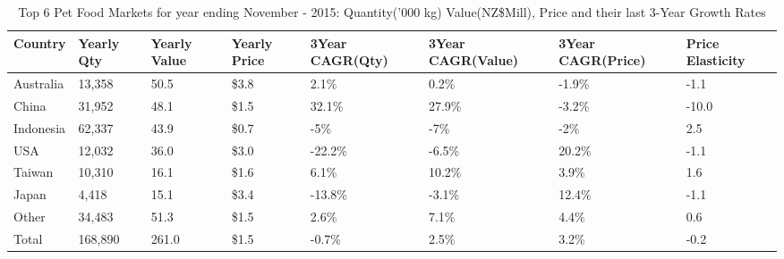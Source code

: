 \begin{table}[ht]
\centering
{\scriptsize
\begin{tabular}[t]{p{1.8cm}>{\hfill}p{1.4cm}>{\hfill}p{1.4cm}>{\hfill}p{1.6cm}>{\hfill}p{1.9cm}>{\hfill}p{2cm}>{\hfill}p{1.9cm}>{\hfill}p{1.5cm}}
 \textbf{Country} & \textbf{Yearly Qty} & \textbf{Yearly Value} & \textbf{Yearly Price} & \textbf{3Year CAGR(Qty)} & \textbf{3Year CAGR(Value)} & \textbf{3Year CAGR(Price)} & \textbf{Price Elasticity} \\
\hline
Australia & 13,358 & 50.5 & \$3.8 & 2.1\% & 0.2\% & -1.9\% & -1.1 \\  
China & 31,952 & 48.1 & \$1.5 & 32.1\% & 27.9\% & -3.2\% & -10.0 \\  
Indonesia & 62,337 & 43.9 & \$0.7 & -5\% & -7\% & -2\% & 2.5 \\  
USA & 12,032 & 36.0 & \$3.0 & -22.2\% & -6.5\% & 20.2\% & -1.1 \\  
Taiwan & 10,310 & 16.1 & \$1.6 & 6.1\% & 10.2\% & 3.9\% & 1.6 \\  
Japan & 4,418 & 15.1 & \$3.4 & -13.8\% & -3.1\% & 12.4\% & -1.1 \\  
Other & 34,483 & 51.3 & \$1.5 & 2.6\% & 7.1\% & 4.4\% & 0.6 \\  
Total & 168,890 & 261.0 & \$1.5 & -0.7\% & 2.5\% & 3.2\% & -0.2 \\  
\hline
\end{tabular}
}
\caption{\scriptsize Top 6 Pet Food Markets for year ending November - 2015: Quantity('000 kg) Value(NZ\$Mill), Price and their last 3-Year Growth Rates}
\end{table}

